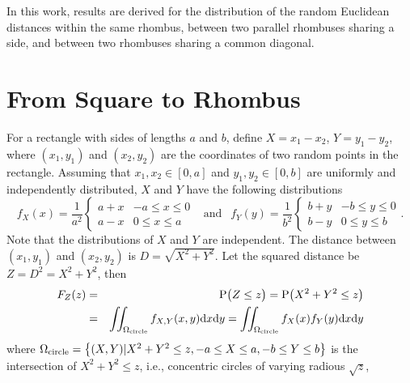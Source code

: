 \documentclass[12pt,draftclsnofoot,onecolumn]{IEEEtran}
\begin{document}
In this work, results are derived for the distribution of
the random Euclidean distances within the same rhombus, between two parallel rhombuses
sharing a side, and between two rhombuses sharing a common diagonal.

\section{From Square to Rhombus}
For a rectangle with sides of lengths $a$ and $b$, define $X=x_1-x_2$,
$Y=y_1-y_2$, where $(x_1, y_1)$ and $(x_2, y_2)$ are the coordinates of two
random points in the rectangle. Assuming that $x_1, x_2 \in [0,a]$ and $y_1, y_2 \in
[0, b]$ are uniformly and independently distributed, $X$ and $Y$ have the following
distributions
\begin{equation}\label{eq:fxy}
  f_X(x)=\frac{1}{a^2}\left\{
    \begin{array}{lr}
      a+x & -a\leq x \leq 0 \\
      a-x & 0 \leq x \leq a
    \end{array}
  \right.
  ~~\mbox{ and }~~ f_Y(y)=\frac{1}{b^2}\left\{
    \begin{array}{lr}
      b+y & -b\leq y \leq 0 \\
      b-y & 0 \leq y \leq b
    \end{array}
  \right..
\end{equation}
%
Note that the distributions of $X$ and $Y$ are independent. The
distance between $(x_1, y_1)$ and $(x_2, y_2)$ is $D=\sqrt{X^2+Y^2}$. Let the
squared distance be $Z=D^2=X^2+Y^2$, then
\begin{eqnarray}\label{eq-rec}
F_Z(z)&=& {\rm P}\big(Z \leq z \big) = {\rm P}\big(X^2+Y^2 \leq z \big)\nonumber\\
&=&\iint_{\Omega_{\rm circle}}f_{X,Y}(x,y){\rm d}x{\rm d}y=
\iint_{\Omega_{\rm circle}}f_X(x)f_Y(y){\rm d}x{\rm d}y
\end{eqnarray}
where $\Omega_{\rm circle}=\left\{(X,Y)|X^2+Y^2\leq z, -a \leq X \leq a, -b \leq Y \leq b\right\}$
is the intersection of $X^2+Y^2\leq z$, i.e., concentric circles of varying radious $\sqrt{z}$, 
\end{document}
